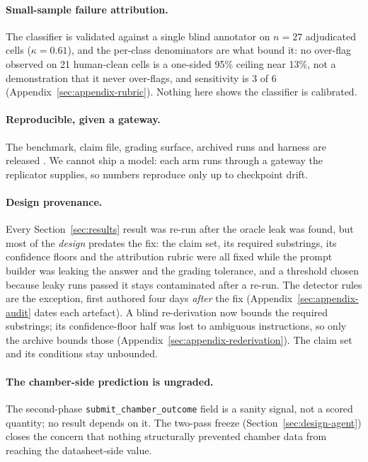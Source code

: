 \documentclass[11pt]{article}
\begin{document}
\paragraph{Small-sample failure attribution.}
The classifier is validated against a single blind annotator on
$n{=}27$ adjudicated cells ($\kappa=0.61$), and the per-class
denominators are what bound it: no over-flag observed on 21 human-clean
cells is a one-sided 95\% ceiling near 13\%, not a demonstration that it
never over-flags, and sensitivity is 3 of 6
(Appendix~\ref{sec:appendix-rubric}). Nothing here shows the classifier
is calibrated.

\paragraph{Reproducible, given a gateway.}
The benchmark, claim file, grading surface, archived runs and harness are
released \citep{datasheetindex}. We cannot ship a model: each arm runs
through a gateway the replicator supplies, so numbers reproduce only up to
checkpoint drift.

\paragraph{Design provenance.}
Every Section~\ref{sec:results} result was re-run after the oracle leak
was found, but most of the
\emph{design} predates the fix: the claim set, its required substrings,
its confidence floors and the attribution rubric were all fixed while
the prompt builder was leaking the answer and the grading tolerance, and
a threshold chosen because leaky runs passed it stays contaminated after
a re-run. The detector rules are the exception, first authored four days
\emph{after} the fix (Appendix~\ref{sec:appendix-audit} dates each
artefact). A blind re-derivation now bounds the required substrings; its
confidence-floor half was lost to ambiguous instructions, so only the
archive bounds those (Appendix~\ref{sec:appendix-rederivation}). The
claim set and its conditions stay unbounded.

\paragraph{The chamber-side prediction is ungraded.}
The second-phase \texttt{submit\_chamber\_outcome} field is a sanity
signal, not a scored quantity; no result depends on it. The two-pass
freeze (Section~\ref{sec:design-agent}) closes the concern that nothing
structurally prevented chamber data from reaching the datasheet-side
value.
\end{document}
